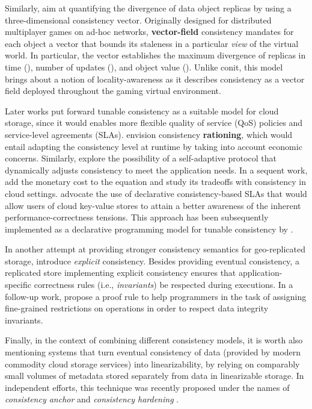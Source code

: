 \documentclass[letter, 11pt]{article}
\newcommand{\citeN}{\citet}
\renewcommand{\cite}{\citep}
\begin{document}
Similarly, \citeN{Santos.Veiga.ea:07} aim at quantifying the 
divergence of data object replicas by using a three-dimensional consistency vector.
Originally designed for distributed multiplayer games on ad-hoc networks,
\textbf{vector-field} consistency mandates for each object a vector 
 that bounds its 
staleness in a particular \emph{view} of the virtual world.
In particular, the vector establishes the maximum divergence of replicas
in time (), number of updates (), and object value ().
Unlike conit, this model brings about a notion of locality-awareness as it describes
consistency as a vector field deployed throughout the gaming virtual environment.

Later works put forward tunable consistency as a suitable model for cloud storage,
since it would enables more flexible quality of service (QoS) policies and 
service-level agreements (SLAs). \citeN{Kraska.Hentschel.ea:09} envision consistency \textbf{rationing}, 
which would entail adapting the consistency level at runtime by taking into account economic concerns.
Similarly, \citeN{Chihoub.Ibrahim.ea:12} explore the possibility 
of a self-adaptive protocol that dynamically adjusts consistency to meet the application needs.
In a sequent work, \citeN{Chihoub.Ibrahim.ea:13} add the monetary cost to the equation 
and study its tradeoffs with consistency in cloud settings.
\citeN{Terry.Prabhakaran.ea:13} advocate the use of 
declarative consistency-based SLAs that would allow users of cloud key-value stores to attain
a better awareness of the inherent performance-correctness tensions.
This approach has been subsequently implemented as a declarative programming model 
for tunable consistency by \citeN{Sivaramakrishnan.ea:15}. 

In another attempt at providing stronger consistency semantics for geo-replicated storage, \citeN{Balegas.Duarte.ea:15} introduce \emph{explicit} consistency.
Besides providing eventual consistency, a replicated store implementing explicit consistency ensures that 
application-specific correctness rules (i.e., \emph{invariants}) be respected during executions.
In a follow-up work, \citeN{Gotsman.ea:16} propose a proof rule to help programmers
in the task of assigning fine-grained restrictions on operations in order to respect data integrity invariants. 

Finally, in the context of combining different consistency models, it is worth also mentioning systems that turn eventual consistency of data (provided by modern commodity cloud storage services) into linearizability, by relying on comparably small volumes of metadata stored separately from data in linearizable storage. In independent efforts, this technique was recently proposed under the names of \emph{consistency anchor} \cite{Bessani.Mendes.ea:14} and \emph{consistency hardening} \cite{Dobre.ea:14}.
\end{document}
